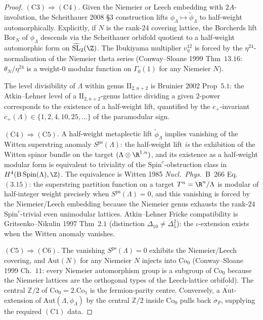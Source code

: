 \begin{proof}[Proof]
$(\mathrm{C}3)\Rightarrow(\mathrm{C}4)$.
Given the Niemeier or Leech embedding with $2A$-involution,
the Scheithauer 2008 \S$3$ construction lifts
$\phi_\Lambda\mapsto\widetilde\phi_\Lambda$ to half-weight
automorphically. Explicitly, if $N$ is the rank-$24$ covering
lattice, the Borcherds lift $\mathrm{Bor}_N$ of $\phi_\Lambda$
descends via the Scheithauer orbifold quotient to a half-weight
automorphic form on $\widetilde{\mathrm{SL}}_2(\Z)$. The Ibukiyama
multiplier $v_\eta^{12}$ is forced by the $\eta^{24}$-normalisation
of the Niemeier theta series
(Conway--Sloane 1999 Thm~$13.16$: $\theta_N/\eta^{24}$ is a weight-$0$
modular function on $\Gamma_0(1)$ for any Niemeier $N$).

The level divisibility of $\Lambda$ within genus $\mathrm{II}_{2, n+2}$
is Bruinier 2002 Prop~$5.1$: the Atkin--Lehner level of a
$\mathrm{II}_{2, n+2}$-genus lattice dividing a given $2$-power
corresponds to the existence of a half-weight lift, quantified
by the $c_+$-invariant $c_+(\Lambda) \in \{1, 2, 4, 10, 25, \ldots\}$
of the paramodular sign.

$(\mathrm{C}4)\Rightarrow(\mathrm{C}5)$.
A half-weight metaplectic lift $\widetilde\phi_\Lambda$ implies
vanishing of the Witten superstring anomaly
$S^{\mathrm{ps}}(\Lambda)$: the half-weight lift \emph{is} the
exhibition of the Witten spinor bundle on the target
$(\Lambda\otimes\R^{1,n})$, and its existence as a half-weight modular
form is equivalent to triviality of the $\mathrm{Spin}^c$-obstruction
class in $H^4(\mathrm{B\,Spin}(\Lambda), \Z)$. The equivalence is
Witten 1985 \emph{Nucl.~Phys.}~B~266 Eq.~$(3.15)$:
the superstring partition function on a target $T^n = \R^n / \Lambda$
is modular of half-integer weight precisely when
$S^{\mathrm{ps}}(\Lambda) = 0$, and this vanishing is forced by the
Niemeier/Leech embedding because the Niemeier genus exhausts the
rank-$24$ $\mathrm{Spin}^c$-trivial even unimodular lattices.
Atkin--Lehner Fricke compatibility is Gritsenko--Nikulin 1997 Thm~$2.1$
(distinction $\Delta_{10}\neq\Delta_5^2$): the $\iota$-extension
exists when the Witten anomaly vanishes.

$(\mathrm{C}5)\Rightarrow(\mathrm{C}6)$.
The vanishing $S^{\mathrm{ps}}(\Lambda) = 0$ exhibits the
Niemeier/Leech covering, and $\mathrm{Aut}(N)$ for any Niemeier
$N$ injects into $\mathrm{Co}_0$ (Conway--Sloane 1999 Ch.~$11$:
every Niemeier automorphism group is a subgroup of $\mathrm{Co}_0$
because the Niemeier lattices are the orthogonal types of the
Leech-lattice orbifold). The central $\mathbb{Z}/2$ of
$\mathrm{Co}_0 = 2.\mathrm{Co}_1$ is the fermion-parity centre.
Conversely, a $\widetilde{\mathrm{Aut}}$-extension of
$\mathrm{Aut}(\Lambda, \phi_\Lambda)$ by the central $\mathbb{Z}/2$
inside $\mathrm{Co}_0$ pulls back $\sigma_F$, supplying the required
$(\mathrm{C}1)$ data.


\end{proof}
